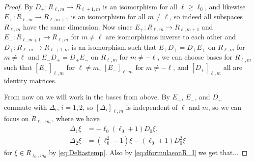 \begin{proof}
  By  $D_+\colon R_{\ell,m}\to R_{\ell+1,m}$ is an isomorphism for all $\ell\geq \ell_0$, and likewise $E_+\colon R_{\ell,m}\to R_{\ell,m+1}$ is an isomorphism for all $m\neq \ell$, so indeed all subspaces $R_{\ell,m}$ have the same dimension. Now since $E_+\colon R_{\ell,m}\to R_{\ell,m+1}$ and $E_-\colon R_{\ell,m+1}\to R_{\ell,m}$ for $m\neq \ell$ are isomorphisms inverse to each other and $D_+\colon R_{\ell,m}\to R_{\ell+1,m}$ is an isomorphism such that $E_+D_+=D_+E_+$ on $R_{\ell,m}$ for $m\neq \ell$ and $E_-D_+=D_+E_-$ on $R_{\ell,m}$ for $m\neq -\ell$, we can choose bases for $R_{\ell,m}$ such that $[E_+]_{\ell,m}$ for $\ell\neq m$, $[E_-]_{\ell,m}$ for $m\neq-\ell$, and $[D_+]_{\ell,m}$ all are identity matrices.

  From now on we will work in the bases from above. By  $E_+$, $E_-$, and $D_+$ commute with $\Delta_i$, $i=1,2$, so $[\Delta_i]_{\ell,m}$ is independent of $\ell$ and $m$, so we can focus on $R_{\ell_0,m_0}$, where we have
  \begin{align*}
    \Delta_1 \xi &= -\ell_0(\ell_0+1)D_0\xi, \\
    \Delta_2 \xi &= (\ell_0^2-1)\xi - (\ell_0+1)D_0^2\xi
  \end{align*}
  for $\xi \in R_{\ell_0,m_0}$ by \cref{eq:Deltastemp}. Also by \cref{eq:dformulaeonR_l} we get that... 
\end{proof}


